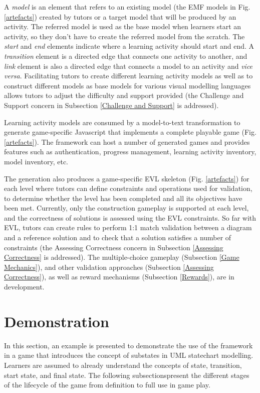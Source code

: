 \documentclass[conference]{IEEEtran}
\begin{document}
A \emph{model} is an element that refers to an existing model (the EMF models in Fig. \ref{artefacts}) created by tutors or a target model that will be produced by an activity. The referred model is used as the base model when learners start an activity, so they don't have to create the referred model from the scratch. The \emph{start} and \emph{end} elements indicate where a learning activity should start and end. A \emph{transition} element is a directed edge that connects one activity to another, and \emph{link} element is also a directed edge that connects a model to an activity and \textit{vice versa}. Facilitating tutors to create different learning activity models as well as to construct different models as base models for various visual modelling languages allows tutors to adjust the difficulty and support provided (the Challenge and Support concern in Subsection \ref{Challenge and Support} is addressed). 

Learning activity models are consumed by a model-to-text transformation to generate game-specific Javascript that implements a complete playable game (Fig. \ref{artefacts}). The framework can host a number of generated games and provides features such as authentication, progress management, learning activity inventory, model inventory, etc.  

The generation also produces a game-specific EVL skeleton (Fig. \ref{artefacts}) for each level where tutors can define constraints and operations used for validation, to determine whether the level has been completed and all its objectives have been met. Currently, only the construction gameplay is supported at each level, and the correctness of solutions is assessed using the EVL constraints. So far with EVL, tutors can create rules to perform 1:1 match validation between a diagram and a reference solution and to check that a solution satisfies a number of constraints (the Assessing Correctness concern in Subsection \ref{Assessing Correctness} is addressed). The multiple-choice gameplay (Subsection \ref{Game Mechanics}), and other validation approaches (Subsection \ref{Assessing Correctness}), as well as reward mechanisms (Subsection \ref{Rewards}), are in development. 


\section{Demonstration}
\label{Demonstration}
In this section, an example is presented to demonstrate the use of the framework in a game that introduces the concept of substates in UML statechart modelling. Learners are assumed to already understand the concepts of state, transition, start state, and final state. The following subsectionspresent the different stages of the lifecycle of the game from definition to full use in game play.
 
\end{document}
